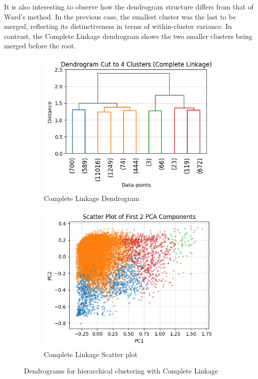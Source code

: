 It is also interesting to observe how the dendrogram structure differs from that of Ward's method.
In the previous case, the smallest cluster was the last to be merged, reflecting its distinctiveness in
terms of within-cluster variance. In contrast, the Complete Linkage dendrogram shows the two smaller
clusters being merged before the root.
\begin{figure}[H]
    \centering
    \begin{subfigure}[b]{0.49\textwidth}
        \centering
        \includegraphics[width=\textwidth]{plots/dendrogram_complete.png}
        \caption{Complete Linkage Dendrogram}
        \label{fig:dendrogram_complete}
    \end{subfigure}
    \begin{subfigure}[b]{0.49\textwidth}
        \centering
        \includegraphics[width=\textwidth]{plots/scatter_complete.png}
        \caption{Complete Linkage Scatter plot}
        \label{fig:pairplot_ward_5}
    \end{subfigure}
    \caption{Dendrograms for hierarchical clustering with Complete Linkage}
    \label{fig:dendrograms_complete}
\end{figure}

